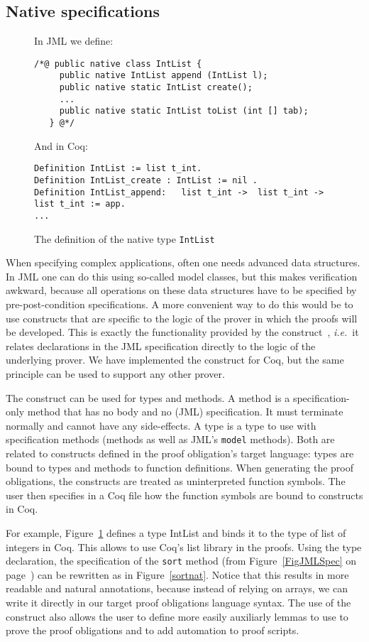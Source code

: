 \subsection{Native specifications}
\begin{figure}[t!]
{\small In JML we define:
\begin{verbatim}
/*@ public native class IntList {
     public native IntList append (IntList l);
     public native static IntList create();
     ...
     public native static IntList toList (int [] tab);
   } @*/ \end{verbatim}

And in Coq:
\begin{verbatim}
Definition IntList := list t_int.
Definition IntList_create : IntList := nil .  
Definition IntList_append:   list t_int ->  list t_int -> list t_int := app.
... \end{verbatim}}
\caption{The definition of the native type \texttt{IntList}}\label{CoqAnnot} 
\end{figure}

When specifying complex applications, often one needs advanced data
structures. In JML one can do this using so-called model classes, but
this makes verification awkward, because all operations on these data
structures have to be specified by pre-post-condition
specifications. A more convenient way to do this would be to use
constructs that are specific to the logic of the prover in which the
proofs will be developed. This is exactly the functionality provided
by the \native construct~\cite{Charles06}, \emph{i.e.}\ it relates
declarations in the JML specification directly to the logic of the
underlying prover. We have implemented the \native construct for Coq,
but the same principle can be used to support any other prover.

The \native construct can be used for types and methods.  A \native
method is a specification-only method that has no body and no (JML)
specification. It must terminate normally and cannot have any
side-effects. A \native type is a type to use with specification
methods (\native methods as well as JML's {\tt model} methods). Both
are related to constructs defined in the proof obligation's target
language: \native types are bound to types and \native methods to
function definitions. When generating the proof obligations, the
\native constructs are treated as uninterpreted function symbols. The
user then specifies in a Coq file how the function symbols are bound
to constructs in Coq. 


For example, Figure~\ref{CoqAnnot} defines a \native type IntList and
binds it to the type of list of integers in Coq. This allows to use
Coq's list library in the proofs. Using the \native type declaration,
the specification of the {\tt sort} method (from
Figure~\ref{FigJMLSpec} on page~\pageref{FigJMLSpec}) can be rewritten
as in Figure~\ref{sortnat}. Notice that this results in more readable
and natural annotations, because instead of relying on arrays, we can
write it directly in our target proof obligations language syntax. The
use of the \native construct also allows the user to define more
easily auxiliarly lemmas to use to prove the proof obligations and to
add automation to proof scripts.


